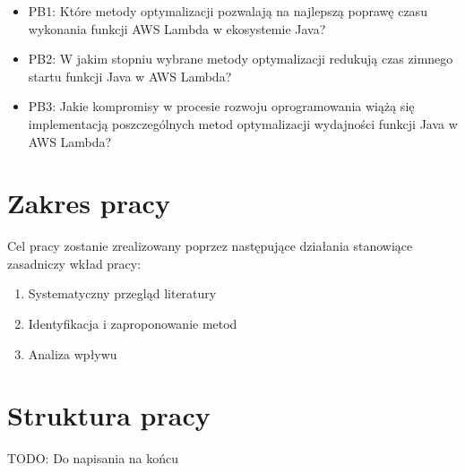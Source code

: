 \begin{itemize}
    \item PB1: Które metody optymalizacji pozwalają na najlepszą poprawę czasu wykonania funkcji AWS Lambda w ekosystemie Java?
    \item PB2: W jakim stopniu wybrane metody optymalizacji redukują czas zimnego startu funkcji Java w AWS Lambda?
    \item PB3: Jakie kompromisy w procesie rozwoju oprogramowania wiążą się implementacją poszczególnych metod optymalizacji wydajności funkcji Java w AWS Lambda?
\end{itemize}

\section*{Zakres pracy}\label{chapter:zakres_pracy}

Cel pracy zostanie zrealizowany poprzez następujące działania stanowiące zasadniczy wkład pracy:
\begin{enumerate}
    \item Systematyczny przegląd literatury
    \item Identyfikacja i zaproponowanie metod
    \item Analiza wpływu
\end{enumerate}

\section*{Struktura pracy}\label{chapter:struktura_pracy}
TODO: Do napisania na końcu